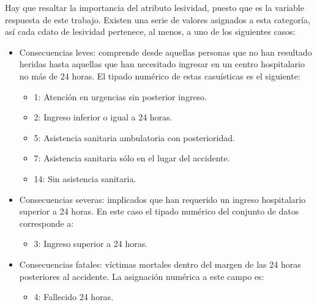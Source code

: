             Hay que resaltar la importancia del atributo lesividad, puesto que es la variable respuesta de este trabajo. Existen una serie de valores asignados a esta categoría, así cada cdato de lesividad pertenece, al menos, a uno de los siguientes casos:

              \begin{itemize}
                    \item Consecuencias leves: comprende desde aquellas personas que no han resultado heridas hasta aquellas que han necesitado ingresar en un centro hospitalario no más de 24 horas. El tipado numérico de estas casuísticas es el siguiente:

                        \begin{itemize}
                            \item 1: Atención en urgencias sin posterior ingreso.
                            \item 2: Ingreso inferior o igual a 24 horas.
                            \item 5: Asistencia sanitaria ambulatoria con posterioridad.
                            \item 7: Asistencia sanitaria sólo en el lugar del accidente.
                            \item 14: Sin asistencia sanitaria.
                        \end{itemize}

                    \item Consecuencias severas: implicados que han requerido un ingreso hospitalario superior a 24 horas. En este caso el tipado numérico del conjunto de datos corresponde a:

                        \begin{itemize}
                            \item 3: Ingreso superior a 24 horas.
                        \end{itemize}

                    \item Consecuencias fatales: víctimas mortales dentro del margen de las 24 horas posteriores al accidente. La asignación numérica a este campo es:

                        \begin{itemize}
                            \item 4: Fallecido 24 horas.
                        \end{itemize}

                \end{itemize}



